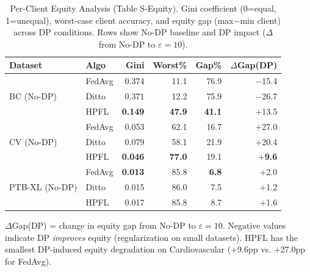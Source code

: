 \documentclass[conference]{IEEEtran}
\begin{document}
\begin{table}[!ht]
\centering
\caption{Per-Client Equity Analysis (Table S-Equity). Gini coefficient (0=equal, 1=unequal), worst-case client accuracy, and equity gap (max$-$min client) across DP conditions. Rows show No-DP baseline and DP impact ($\Delta$ from No-DP to $\varepsilon{=}10$).}
\label{tab:s_equity}
\scriptsize
\begin{tabular}{llrrrr}
\toprule
\textbf{Dataset} & \textbf{Algo} & \textbf{Gini} & \textbf{Worst\%} & \textbf{Gap\%} & \textbf{$\Delta$Gap(DP)} \\
\midrule
\multirow{3}{*}{BC (No-DP)} & FedAvg & 0.374 & 11.1 & 76.9 & $-$15.4 \\
 & Ditto & 0.371 & 12.2 & 75.9 & $-$26.7 \\
 & HPFL & \textbf{0.149} & \textbf{47.9} & \textbf{41.1} & $+$13.5 \\
\midrule
\multirow{3}{*}{CV (No-DP)} & FedAvg & 0.053 & 62.1 & 16.7 & $+$27.0 \\
 & Ditto & 0.079 & 58.1 & 21.9 & $+$20.4 \\
 & HPFL & \textbf{0.046} & \textbf{77.0} & 19.1 & \textbf{$+$9.6} \\
\midrule
\multirow{3}{*}{PTB-XL (No-DP)} & FedAvg & \textbf{0.013} & 85.8 & \textbf{6.8} & $+$2.0 \\
 & Ditto & 0.015 & 86.0 & 7.5 & $+$1.2 \\
 & HPFL & 0.017 & 85.8 & 8.7 & $+$1.6 \\
\bottomrule
\end{tabular}

\vspace{1mm}
\footnotesize{$\Delta$Gap(DP) = change in equity gap from No-DP to $\varepsilon{=}10$. Negative values indicate DP \textit{improves} equity (regularization on small datasets). HPFL has the smallest DP-induced equity degradation on Cardiovascular ($+$9.6pp vs. $+$27.0pp for FedAvg).}
\end{table}
\end{document}
